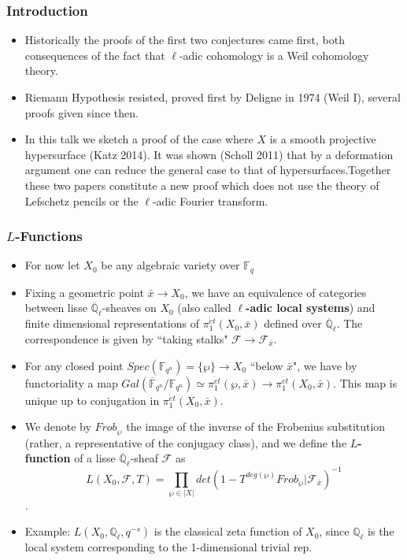 \documentclass{beamer}
\begin{document}
\begin{frame}
\frametitle{Introduction}
\begin{itemize}
\pause
\item Historically the proofs of the first two conjectures came first, both consequences of the fact that $\ell$-adic cohomology is a Weil cohomology theory. 
\pause 
\item Riemann Hypothesis resisted, proved first by Deligne in 1974 (Weil I), several proofs given since then. 
\pause
\item In this talk we sketch a proof of the case where $X$ is a smooth projective hypersurface (Katz 2014). It was shown (Scholl 2011) that by a deformation argument one can reduce the general case to that of hypersurfaces.\pause Together these two papers constitute a new proof which does not use the theory of Lefschetz pencils or the $\ell$-adic Fourier transform. 
\end{itemize} 
\end{frame}

\begin{frame}
\frametitle{$L$-Functions}
\begin{itemize}
\pause
\item For now let $X_0$ be any algebraic variety over $\mathbb{F}_{q}$
\pause
\item Fixing a geometric point $\bar{x} \rightarrow X_0$, we have an equivalence of categories between lisse  $\overline{\mathbb{Q}}_{\ell}$-sheaves on $X_0$ (also called \textbf{$\ell$-adic local systems}) and finite dimensional representations of $\pi_{1}^{\acute{e}t}(X_0,\bar{x})$ defined over $\overline{\mathbb{Q}}_{\ell}$. \pause The correspondence is given by ``taking stalks" $\mathcal{F} \rightarrow \mathcal{F}_{\bar{x}}$. 
\pause
\item For any closed point $Spec(\mathbb{F}_{q^{n}}) = \{\wp\} \rightarrow X_0$ ``below $\bar{x}$", we have by
 functoriality a map $Gal(\overline{\mathbb{F}}_{q^n}/\mathbb{F}_{q^n}) \simeq \pi_{1}^{\acute{e}t}(\wp,
  \bar{x}) \rightarrow \pi_{1}^{\acute{e}t}(X_0,\bar{x})$. \pause This map is unique up to conjugation in
   $\pi_{1}^{\acute{e}t}(X_0,\bar{x})$. 
\pause
\item We denote by $Frob_{\wp}$ the image of the inverse of the Frobenius substitution (rather, a representative of the conjugacy class), \pause and we define the \textbf{$L$-function} of a lisse $\overline{\mathbb{Q}}_{\ell}$-sheaf $\mathcal{F}$ as 
$$L(X_0,\mathcal{F}, T) = \prod\limits_{\wp\in |X|}det(1-T^{deg(\wp)}Frob_{\wp}|\mathcal{F}_{\bar{x}})^{-1}$$.
\pause
\item Example: $L(X_0,\mathbb{Q}_{\ell}, q^{-s})$ is the classical zeta function of $X_0$, since $\mathbb{Q}_{\ell}$ is the local system corresponding to the 1-dimensional trivial rep. 
\end{itemize}
\end{frame}
\end{document}

